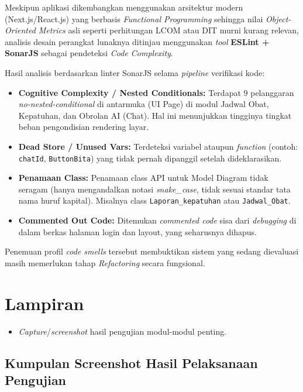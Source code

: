 \documentclass[12pt, a4paper]{article}
\begin{document}
Meskipun aplikasi dikembangkan menggunakan arsitektur modern (Next.js/React.js) yang berbasis \textit{Functional Programming} sehingga nilai \textit{Object-Oriented Metrics} asli seperti perhitungan LCOM atau DIT murni kurang relevan, analisis desain perangkat lunaknya ditinjau menggunakan \textit{tool} \textbf{ESLint + SonarJS} sebagai pendeteksi \textit{Code Complexity}.

Hasil analisis berdasarkan linter SonarJS selama \textit{pipeline} verifikasi kode:
\begin{itemize}[leftmargin=2em]
    \item \textbf{Cognitive Complexity / Nested Conditionals:} Terdapat $9$ pelanggaran \textit{no-nested-conditional} di antarmuka (UI Page) di modul Jadwal Obat, Kepatuhan, dan Obrolan AI (Chat). Hal ini menunjukkan tingginya tingkat beban pengondisian rendering layar.
    \item \textbf{Dead Store / Unused Vars:} Terdeteksi variabel ataupun \textit{function} (contoh: \texttt{chatId}, \texttt{ButtonBita}) yang tidak pernah dipanggil setelah dideklarasikan.
    \item \textbf{Penamaan Class:} Penamaan class API untuk Model Diagram tidak seragam (hanya mengandalkan notasi \textit{snake\_case}, tidak sesuai standar tata nama huruf kapital). Misalnya class \texttt{Laporan\_kepatuhan} atau \texttt{Jadwal\_Obat}.
    \item \textbf{Commented Out Code:} Ditemukan \textit{commented code} sisa dari \textit{debugging} di dalam berkas halaman login dan layout, yang seharusnya dihapus.
\end{itemize}

Penemuan profil \textit{code smells} tersebut membuktikan sistem yang sedang dievaluasi masih memerlukan tahap \textit{Refactoring} secara fungsional.

\section{Lampiran}

\begin{itemize}[leftmargin=2em]
  \item \textit{Capture}/\textit{screenshot} hasil pengujian modul-modul penting.
\end{itemize}

\subsection{Kumpulan Screenshot Hasil Pelaksanaan Pengujian}
\end{document}
